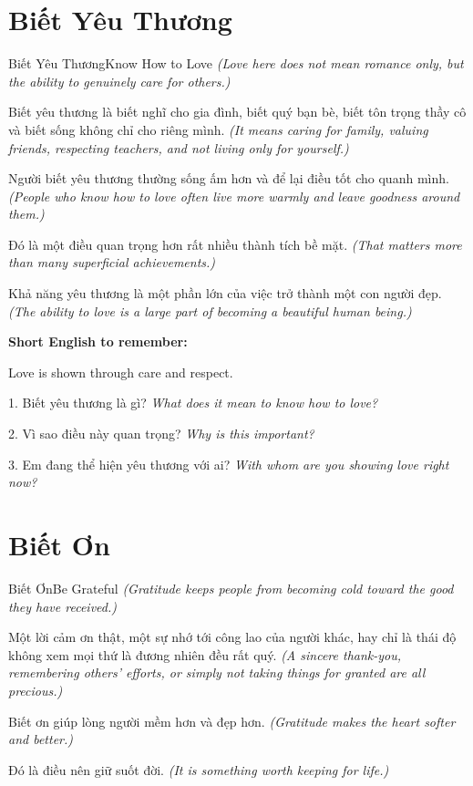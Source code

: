 \section{Biết Yêu Thương}
\begin{truyen}{Biết Yêu Thương}{Know How to Love}
\textit{(Love here does not mean romance only, but the ability to genuinely care for others.)}

Biết yêu thương là biết nghĩ cho gia đình, biết quý bạn bè, biết tôn trọng thầy cô và biết sống không chỉ cho riêng mình.
\textit{(It means caring for family, valuing friends, respecting teachers, and not living only for yourself.)}

Người biết yêu thương thường sống ấm hơn và để lại điều tốt cho quanh mình.
\textit{(People who know how to love often live more warmly and leave goodness around them.)}

Đó là một điều quan trọng hơn rất nhiều thành tích bề mặt.
\textit{(That matters more than many superficial achievements.)}
\end{truyen}

\begin{baihoc}
Khả năng yêu thương là một phần lớn của việc trở thành một con người đẹp.
\textit{(The ability to love is a large part of becoming a beautiful human being.)}
\end{baihoc}

\begin{ghinhoanh}
\textbf{Short English to remember:}

Love is shown through care and respect.

\end{ghinhoanh}

\begin{tuhocnhanh}
1. Biết yêu thương là gì? \textit{What does it mean to know how to love?}

2. Vì sao điều này quan trọng? \textit{Why is this important?}

3. Em đang thể hiện yêu thương với ai? \textit{With whom are you showing love right now?}
\end{tuhocnhanh}
\ngancach

\section{Biết Ơn}
\begin{truyen}{Biết Ơn}{Be Grateful}
\textit{(Gratitude keeps people from becoming cold toward the good they have received.)}

Một lời cảm ơn thật, một sự nhớ tới công lao của người khác, hay chỉ là thái độ không xem mọi thứ là đương nhiên đều rất quý.
\textit{(A sincere thank-you, remembering others' efforts, or simply not taking things for granted are all precious.)}

Biết ơn giúp lòng người mềm hơn và đẹp hơn.
\textit{(Gratitude makes the heart softer and better.)}

Đó là điều nên giữ suốt đời.
\textit{(It is something worth keeping for life.)}
\end{truyen}

